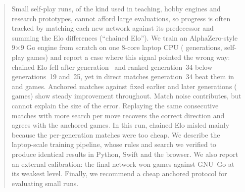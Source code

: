 \begin{abstract}
Small self-play runs, of the kind used in teaching, hobby engines and research prototypes, cannot afford
large evaluations, so progress is often tracked by matching each new network against its predecessor and
summing the Elo differences (``chained Elo'').
We train an AlphaZero-style 9$\times$9 Go engine from scratch on one 8-core laptop CPU
(\valNGens{} generations, \valTotalGames{} self-play games) and report a case where this signal pointed
the wrong way: chained Elo fell after generation~\valChainedPeakGen{} and ranked generation~34 below
generations~19 and~25, yet in direct matches generation~34 beat them in \valHTtfVsNt{} and \valHTtfVsTf{}
games.
Anchored matches against fixed earlier and later generations (\valHtoHGames{} games) show steady
improvement throughout.
Match noise contributes, but cannot explain the size of the error. Replaying the same consecutive
matches with more search per move recovers the correct direction and agrees with the anchored games. In
this run, chained Elo misled mainly because the per-generation matches were too cheap.
We describe the laptop-scale training pipeline, whose rules and search we verified to produce identical
results in Python, Swift and the browser. We also report an external calibration: the final network won
\valGnuWins{} games against GNU~Go at its weakest level. Finally, we recommend a cheap anchored protocol
for evaluating small runs.
\end{abstract}
